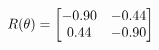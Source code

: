 \documentclass[preview]{standalone}
\begin{document}
\begin{align*}
\special{dvisvgm:raw <g id='unique000'>}R(\theta) = \begin{bmatrix}-0.90 & -0.44\\0.44 & -0.90\end{bmatrix}\special{dvisvgm:raw </g>}
\end{align*}
\end{document}
